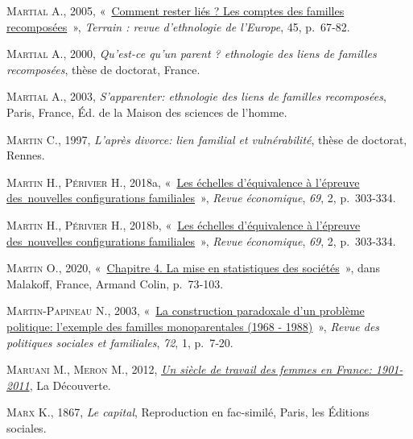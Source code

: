\documentclass[
  12pt,
]{book}
\newlength{\cslhangindent}
\newenvironment{CSLReferences}[2] %
 {\begin{list}{}{%
  \setlength{\itemindent}{0pt}
  \setlength{\leftmargin}{0pt}
  \setlength{\parsep}{0pt}
  \ifodd #1
   \setlength{\leftmargin}{\cslhangindent}
   \setlength{\itemindent}{-1\cslhangindent}
  \fi
  \setlength{\itemsep}{#2\baselineskip}}}
 {\end{list}}
\begin{document}
\begin{CSLReferences}{0}{1}
\textsc{Martial A.}, 2005,
{«~\href{https://doi.org/10.4000/terrain.3550}{Comment rester liés ? Les
comptes des familles recomposées}~»}, \emph{Terrain : revue d'ethnologie
de l'Europe}, 45, p.~67‑82.

\textsc{Martial A.}, 2000, \emph{Qu'est-ce qu'un parent ? ethnologie des
liens de familles recomposées}, thèse de doctorat, France.

\textsc{Martial A.}, 2003, \emph{S'apparenter: ethnologie des liens de
familles recomposées}, Paris, France, Éd. de la Maison des sciences de
l'homme.

\textsc{Martin C.}, 1997, \emph{L'après divorce: lien familial et
vulnérabilité}, thèse de doctorat, Rennes.

\textsc{Martin H.}, \textsc{Périvier H.}, 2018a,
{«~\href{https://doi.org/10.3917/reco.pr2.0114}{Les échelles
d{'}équivalence à l{'}épreuve des~nouvelles configurations
familiales}~»}, \emph{Revue économique}, \emph{69}, 2, p.~303‑334.

\textsc{Martin H.}, \textsc{Périvier H.}, 2018b,
{«~\href{https://doi.org/10.3917/reco.pr2.0114}{Les échelles
d{'}équivalence à l{'}épreuve des~nouvelles configurations
familiales}~»}, \emph{Revue économique}, \emph{69}, 2, p.~303‑334.

\textsc{Martin O.}, 2020,
{«~\href{https://www.cairn.info/l-empire-des-chiffres--9782200625719-page-73.htm}{Chapitre
4. La mise en statistiques des sociétés}~»}, dans Malakoff, France,
Armand Colin, p.~73‑103.

\textsc{Martin-Papineau N.}, 2003,
{«~\href{https://doi.org/10.3406/caf.2003.1983}{La construction
paradoxale d{'}un problème politique: l{'}exemple des familles
monoparentales (1968 - 1988)}~»}, \emph{Revue des politiques sociales et
familiales}, \emph{72}, 1, p.~7‑20.

\textsc{Maruani M.}, \textsc{Meron M.}, 2012,
\emph{\href{https://doi.org/10.3917/dec.marua.2012.01}{Un siècle de
travail des femmes en France: 1901- 2011}}, La Découverte.

\textsc{Marx K.}, 1867, \emph{Le capital}, Reproduction en fac-similé,
Paris, les Éditions sociales.


\end{CSLReferences}
\end{document}
